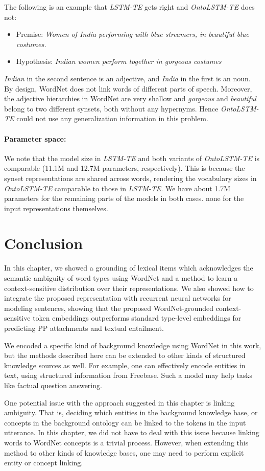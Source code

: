 The following is an example that \textit{LSTM-TE} gets right and \textit{OntoLSTM-TE} does not:
\begin{itemize}
 \item Premise: \textit{Women of India performing with blue streamers, in 
beautiful blue costumes.}
 \item Hypothesis: \textit{Indian women perform together in gorgeous costumes}
\end{itemize}
\textit{Indian} in the second sentence is an adjective, and \textit{India} in 
the first is an noun. By design, WordNet does not link words of different parts 
of speech. Moreover, the adjective hierarchies in WordNet are very shallow and 
\textit{gorgeous} and \textit{beautiful} belong to two different synsets, both 
without any hypernyms. Hence \textit{OntoLSTM-TE} could not use any generalization 
information in this problem.

\paragraph{Parameter space:} We note that the model size in \textit{LSTM-TE} and both 
variants of \textit{OntoLSTM-TE} is comparable (11.1M and 12.7M parameters, respectively). 
This is because the synset representations are shared across words, rendering 
the vocabulary sizes in \textit{OntoLSTM-TE} camparable to those in \textit{LSTM-TE}. We have about 1.7M 
parameters for the remaining parts of the models in both cases. 
none for the input representations themselves.

\section{Conclusion}
In this chapter, we showed a grounding of lexical items which acknowledges the semantic ambiguity 
of word types using WordNet and a method to learn a context-sensitive distribution over their representations.
We also showed how to integrate the proposed representation with recurrent neural networks for modeling sentences,
showing that the proposed WordNet-grounded context-sensitive token embeddings outperforms standard type-level embeddings
for predicting PP attachments and textual entailment.

We encoded a specific kind of background knowledge using WordNet in this work, but the methods described here can be extended 
to other kinds of structured knowledge sources as well. For example, one can effectively encode entities in text, using structured information
from Freebase. Such a model may help tasks like factual question answering.

One potential issue with the approach suggested in this chapter is
linking ambiguity. That is, deciding which entities in the background knowledge base, or concepts in the background ontology can be linked to
the tokens in the input utterance. In this chapter, we did not have to deal with this issue because linking words to WordNet concepts is a
trivial process. However, when extending this method to other kinds of knowledge bases, one may need to perform explicit entity or concept linking.